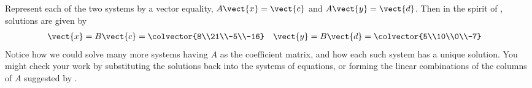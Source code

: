 Represent each of the two systems by a vector equality, $A\vect{x}=\vect{c}$ and $A\vect{y}=\vect{d}$.  Then in the spirit of , solutions are given by
%
\begin{align*}
\vect{x}&=B\vect{c}=\colvector{8\\21\\-5\\-16}&
\vect{y}&=B\vect{d}=\colvector{5\\10\\0\\-7}
\end{align*}
%
Notice how we could solve many more systems having $A$ as the coefficient matrix, and how each such system has a unique solution.  You might check your work by substituting the solutions back into the systems of equations, or forming the linear combinations of the columns of $A$ suggested by .
